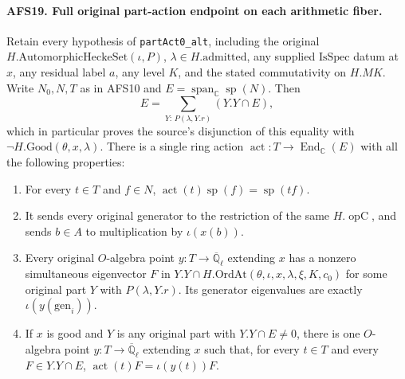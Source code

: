 \paragraph{AFS19. Full original part-action endpoint on each arithmetic fiber.}
\label{claim:AFS19}
Retain every hypothesis of \texttt{partAct0\_alt}, including
the original $H.\mathrm{AutomorphicHeckeSet}(\iota,P)$,
$\lambda\in H.\mathrm{admitted}$, any supplied
$\mathrm{IsSpec}$ datum at $x$, any residual label $a$,
any level $K$, and the stated commutativity on $H.MK$.
Write $N_0,N,T$ as in AFS10 and
$E=\operatorname{span}_{\mathbb C}\operatorname{sp}(N)$.
Then
\[
 E=\sum_{Y:\,P(\lambda,Y.r)}(Y.Y\cap E),
\]
which in particular proves the source's disjunction of
this equality with $\neg H.\mathrm{Good}(\theta,x,\lambda)$.
There is a single ring action
$\operatorname{act}:T\to\operatorname{End}_{\mathbb C}(E)$
with all the following properties:
\begin{enumerate}
\item For every $t\in T$ and $f\in N$,
$\operatorname{act}(t)\operatorname{sp}(f)=\operatorname{sp}(tf)$.
\item It sends every original generator to the restriction
of the same $H.\operatorname{opC}$, and sends $b\in A$
to multiplication by $\iota(x(b))$.
\item Every original $O$-algebra point $y:T\to
\overline{\mathbb Q}_\ell$ extending $x$ has a nonzero
simultaneous eigenvector $F$ in
$Y.Y\cap H.\mathrm{OrdAt}(\theta,\iota,x,\lambda,\xi,K,c_0)$
for some original part $Y$ with $P(\lambda,Y.r)$.  Its
generator eigenvalues are exactly $\iota(y(\mathrm{gen}_i))$.
\item If $x$ is good and $Y$ is any original part with
$Y.Y\cap E\ne0$, there is one $O$-algebra point
$y:T\to\overline{\mathbb Q}_\ell$ extending $x$ such
that, for every $t\in T$ and every $F\in Y.Y\cap E$,
$\operatorname{act}(t)F=\iota(y(t))F$.
\end{enumerate}
